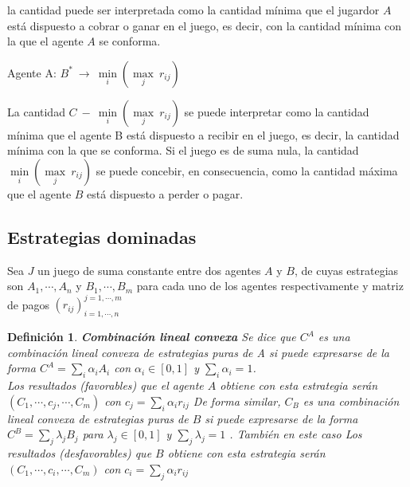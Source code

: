 la cantidad puede ser interpretada como la cantidad mínima que el jugardor $A$ está dispuesto a cobrar o ganar en el juego, es decir, con la cantidad mínima con la que el agente $A$ se conforma.
\\
\begin{center}
Agente A: $B^* \: \rightarrow \: \underset{i}{\min}\left( \underset{j}{\max} \: r_{ij} \right) $
\end{center}

La cantidad $C \: - \: \underset{i}{\min}\left( \underset{j}{\max} \: r_{ij} \right) $ se puede interpretar como la cantidad mínima que el agente B está dispuesto a recibir en el juego, es decir, la cantidad mínima con la que se conforma. Si el juego es de suma nula, la cantidad $\underset{i}{\min}\left( \underset{j}{\max} \: r_{ij} \right)$ se puede concebir, en consecuencia, como la cantidad máxima que el agente $B$ está dispuesto a perder o pagar.
\subsection{Estrategias dominadas}

Sea $J$ un juego de suma constante entre dos agentes  $A$ y $B$, de cuyas estrategias son $A_1,\cdots , A_n$ y $ B_1, \cdots , B_m$ para cada uno de los agentes respectivamente y matriz de pagos $\left( r_{ij}\right)_{i=1, \cdots ,n}^{j=1, \cdots, m} $

\theoremstyle{definicion}
\newtheorem{definicion}{Definición}
\begin{definicion}\label{Def:Comb_lin_conv}
\textbf{Combinación lineal convexa}
Se dice que $C^A$ es una combinación lineal convexa de estrategias puras de A si puede expresarse de la forma $C^A = \underset{i}{\sum}\alpha_i A_i$ con $\alpha_i \in \left[ 0,1 \right]$ y $\underset{i}{\sum} \alpha_i = 1$.\\
Los resultados (favorables) que el agente $A$ obtiene con esta estrategia  serán $\left( C_1, \cdots, c_j, \cdots, C_m\right)$ con $c_j = \underset{i}{\sum}\alpha_i r_{ij}$ De forma similar, $C_B$ es una combinación lineal convexa de estrategias puras de $B$ si puede expresarse de la forma $C^B = \underset{j}{\sum}\lambda_j B_j$ para $\lambda_j \in  \left[ 0,1 \right]$ y $\underset{j}{\sum}\lambda_j = 1$ .  También en este caso Los resultados (desfavorables) que $B$ obtiene con esta estrategia serán $\left( C_1, \cdots, c_i, \cdots, C_m\right)$ con $c_i = \underset{j}{\sum}\alpha_i r_{ij}$
\end{definicion}

